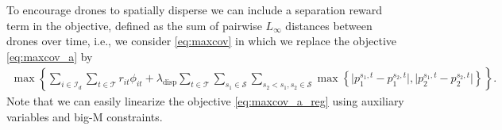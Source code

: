 \documentclass{article}
\newcommand{\set}[1]{\mathcal{#1}}
\begin{document}
To encourage drones to spatially disperse we can include a separation reward term in the objective, defined as the sum of pairwise $L_{\infty}$ distances between drones over time, i.e., we consider \eqref{eq:maxcov} in which we replace the objective \eqref{eq:maxcov_a} by
\begin{align} \label{eq:maxcov_a_reg}
    \max \left\{ \sum_{i \in \set I_d} \sum_{t \in \set T} r_{it} \phi_{it} + \lambda_{\text{disp}} \sum_{t \in \set T} \sum_{s_1 \in \set S} \sum_{s_2 < s_1, s_2 \in \set S} \max \left\{\big|p^{s_1,t}_1 - p^{s_2,t}_1\big|, \big|p^{s_1,t}_2 - p^{s_2,t}_2\big| \right\} \right\}. 
    \end{align}
Note that we can easily linearize the objective \eqref{eq:maxcov_a_reg} using auxiliary variables and big-M constraints.





\end{document}
